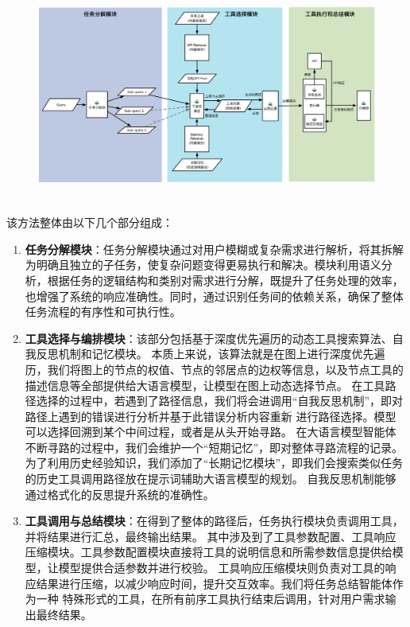 \begin{figure}[!htp]
  \vspace{1em}
  \centering
  \setlength{\abovecaptionskip}{10pt} %
  \includegraphics[height=7cm]{../assets/ch4-整体框架图-3.pdf}
  \label{fig:ch4-framework}
\end{figure}

该方法整体由以下几个部分组成：

\begin{enumerate}
  \item \textbf{任务分解模块}：任务分解模块通过对用户模糊或复杂需求进行解析，将其拆解为明确且独立的子任务，使复杂问题变得更易执行和解决。模块利用语义分析，根据任务的逻辑结构和类别对需求进行分解，既提升了任务处理的效率，也增强了系统的响应准确性。同时，通过识别任务间的依赖关系，确保了整体任务流程的有序性和可执行性。
  \item \textbf{工具选择与编排模块}：该部分包括基于深度优先遍历的动态工具搜索算法、自我反思机制和记忆模块。
  本质上来说，该算法就是在图上进行深度优先遍历，我们将图上的节点的权值、节点的邻居点的边权等信息，以及节点工具的描述信息等全部提供给大语言模型，让模型在图上动态选择节点。
  在工具路径选择的过程中，若遇到了路径信息，我们将会进调用“自我反思机制”，即对路径上遇到的错误进行分析并基于此错误分析内容重新
  进行路径选择。模型可以选择回溯到某个中间过程，或者是从头开始寻路。
  在大语言模型智能体不断寻路的过程中，我们会维护一个“短期记忆”，即对整体寻路流程的记录。
  为了利用历史经验知识，我们添加了“长期记忆模块”，即我们会搜索类似任务的历史工具调用路径放在提示词辅助大语言模型的规划。
  自我反思机制能够通过格式化的反思提升系统的准确性。
  \item \textbf{工具调用与总结模块}：在得到了整体的路径后，任务执行模块负责调用工具，并将结果进行汇总，最终输出结果。
  其中涉及到了工具参数配置、工具响应压缩模块。工具参数配置模块直接将工具的说明信息和所需参数信息提供给模型，让模型提供合适参数并进行校验。
  工具响应压缩模块则负责对工具的响应结果进行压缩，以减少响应时间，提升交互效率。我们将任务总结智能体作为一种
  特殊形式的工具，在所有前序工具执行结束后调用，针对用户需求输出最终结果。
\end{enumerate}

